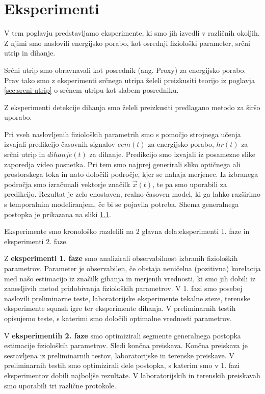 \chapter{Eksperimenti}\label{sec:eksperimenti}
V tem poglavju predstavljamo eksperimente, ki smo jih izvedli v različnih okoljih. Z njimi smo naslovili energijsko porabo, kot osrednji fiziološki parameter, srčni utrip in dihanje. 

Srčni utrip smo obravnavali kot posrednik (ang. Proxy) za energijsko porabo. Prav tako smo z eksperimenti srčnega utripa želeli preizkusiti teorijo iz poglavja \ref{sec:srcni-utrip} o srčnem utripu kot slabem posredniku.

Z eksperimenti detekcije dihanja smo želeli preizkusiti predlagano metodo za širšo uporabo.

Pri vseh naslovljenih fizioloških parametrih smo s pomočjo strojnega učenja izvajali predikcijo časovnih signalov $eem(t)$ za energijsko porabo, $hr(t)$ za srčni utrip in $dihanje(t)$ za dihanje. Predikcijo smo izvajali iz posamezne slike zaporedja video posnetka. Pri tem smo najprej generirali sliko optičnega ali prostorskega toka in nato določili področje, kjer se nahaja merjenec. Iz izbranega področja smo izračunali vektorje značilk $\vec{x}(t)$, te pa smo uporabili za predikcijo. Rezultat je zelo enostaven, realno-časoven model, ki ga lahko razširimo s temporalnim modeliranjem, če bi se pojavila potreba. Shema generalnega postopka je prikazana na sliki \ref{fig:shema-generalnega-postopka}.

\begin{figure}
\caption{}
\label{fig:shema-generalnega-postopka}
\end{figure}

Eksperimente smo kronološko razdelili na 2 glavna dela:eksperimenti 1. faze in eksperimenti 2. faze.

Z \textbf{eksperimenti 1. faze} smo analizirali observabilnost izbranih fizioloških parametrov. Parameter je observabilen, če obstaja neničelna (pozitivna) korelacija med našo estimacijo iz značilk gibanja in merjenih vrednosti, ki smo jih dobili iz zanesljivih metod pridobivanja fizioloških parametrov. V 1. fazi smo posebej naslovili preliminarne teste, laboratorijske eksperimente tekalne steze, terenske eksperimente squash igre ter eksperimente dihanja. V {preliminarnih testih} opisujemo teste, s katerimi smo določili optimalne vrednosti parametrov. 


V \textbf{eksperimentih 2. faze} smo optimizirali segmente generalnega postopka estimacije fizioloških parametrov. Sledi končna preiskava. Končna preiskava je sestavljena iz preliminarnih testov, laboratorijske in terenske preiskave. V preliminarnih testih smo optimizirali dele postopka, s katerim smo v 1. fazi eksperimentov dobili najboljše rezultate. V laboratorijskih in terenskih preiskavah smo uporabili tri različne protokole.

